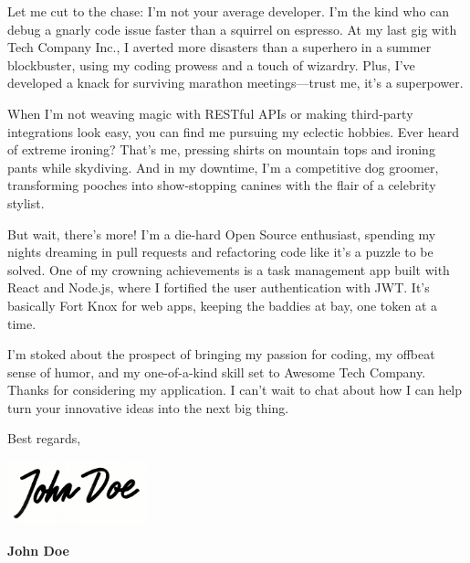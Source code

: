 \begin{minipage}[t][\pageheight]{\textwidth}
	Let me cut to the chase: I’m not your average developer. I’m the kind who can debug a gnarly code issue faster than a squirrel on espresso. At my last gig with Tech Company Inc., I averted more disasters than a superhero in a summer blockbuster, using my coding prowess and a touch of wizardry. Plus, I’ve developed a knack for surviving marathon meetings—trust me, it’s a superpower.

    \vspace{1em}

	When I'm not weaving magic with RESTful APIs or making third-party integrations look easy, you can find me pursuing my eclectic hobbies. Ever heard of extreme ironing? That's me, pressing shirts on mountain tops and ironing pants while skydiving. And in my downtime, I’m a competitive dog groomer, transforming pooches into show-stopping canines with the flair of a celebrity stylist.

    \vspace{1em}

	But wait, there’s more! I’m a die-hard Open Source enthusiast, spending my nights dreaming in pull requests and refactoring code like it’s a puzzle to be solved. One of my crowning achievements is a task management app built with React and Node.js, where I fortified the user authentication with JWT. It's basically Fort Knox for web apps, keeping the baddies at bay, one token at a time.

    \vspace{1em}

	I’m stoked about the prospect of bringing my passion for coding, my offbeat sense of humor, and my one-of-a-kind skill set to Awesome Tech Company. Thanks for considering my application. I can’t wait to chat about how I can help turn your innovative ideas into the next big thing.

    \vspace{3em}

	\begin{flushright}
		Best regards,

		\vspace{2em}

		\includegraphics[height=5em]{media/signature.png}

		\textbf{John Doe}
	\end{flushright}

\end{minipage}
